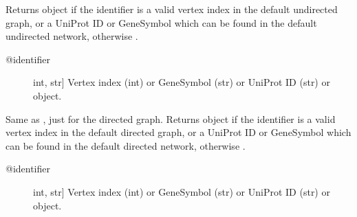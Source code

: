 \documentclass[letterpaper,10pt,english]{sphinxmanual}
\begin{document}
\begin{fulllineitems}

\begin{fulllineitems}
\label{\detokenize{main:pypath.main.PyPath.get_network}}
\end{fulllineitems}


\begin{fulllineitems}
\label{\detokenize{main:pypath.main.PyPath.get_node}}
Returns  object if the identifier
is a valid vertex index in the default undirected graph,
or a UniProt ID or GeneSymbol which can be found in the
default undirected network, otherwise .
\begin{description}
\item[{@identifier}] \leavevmode{[}int, str{]}
Vertex index (int) or GeneSymbol (str) or UniProt ID (str) or
 object.

\end{description}

\end{fulllineitems}


\begin{fulllineitems}
\label{\detokenize{main:pypath.main.PyPath.get_node_d}}
Same as , just for the directed graph.
Returns  object if the identifier
is a valid vertex index in the default directed graph,
or a UniProt ID or GeneSymbol which can be found in the
default directed network, otherwise .
\begin{description}
\item[{@identifier}] \leavevmode{[}int, str{]}
Vertex index (int) or GeneSymbol (str) or UniProt ID (str) or
 object.

\end{description}

\end{fulllineitems}


\end{fulllineitems}
\end{document}
